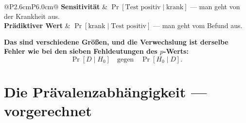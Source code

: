 \begin{warnung}
\begin{center}
\renewcommand{\arraystretch}{1.55}
\begin{tabular}{@{}P{2.6cm}P{6.0cm}@{}}
\toprule
\textbf{Sensitivität} & $\Pr[\text{Test positiv} \mid \text{krank}]$ --- man geht von der Krankheit aus.\\
\textbf{Prädiktiver Wert} & $\Pr[\text{krank} \mid \text{Test positiv}]$ --- man geht vom Befund aus.\\
\bottomrule
\end{tabular}
\end{center}

\begin{center}
\begin{minipage}{0.9\textwidth}
\textbf{Das sind verschiedene Größen, und die Verwechslung ist derselbe Fehler wie bei den sieben Fehldeutungen des $p$-Werts:}
\[ \Pr[D \mid H_0] \quad \text{gegen} \quad \Pr[H_0 \mid D] . \]
\end{minipage}
\end{center}

\begin{center}
\begin{minipage}{0.88\textwidth}
\end{minipage}
\end{center}
\end{warnung}

\section{Die Prävalenzabhängigkeit --- vorgerechnet}

